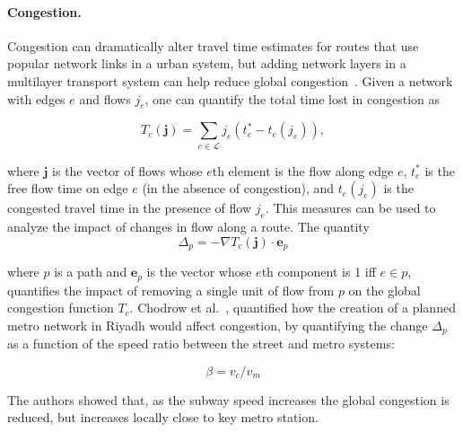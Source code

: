 \paragraph{Congestion.} 
Congestion can dramatically alter travel time estimates for routes that use popular network links in a urban system, but adding network layers in a multilayer transport system can help reduce global congestion~\cite{chodrow2016congestion}. Given a network with edges $e$ and flows $j_e$, one can quantify the total time lost in congestion as 

\begin{equation}
    T_c(\textbf{j})=\sum_{e\in \mathcal{L}}j_e(t_e^* - t_e(j_e)),
\end{equation}

where $\textbf{j}$ is the vector of flows whose $e$th element is the flow along edge $e$, $t_e^*$ is the free flow time on edge $e$ (in the absence of congestion), and $t_e(j_e)$ is the congested travel time in the presence of flow $j_e$. 
This measures can be used to analyze the impact of changes in flow along a route. The quantity
\begin{equation}
    \Delta_p = - \nabla T_c(\textbf{j}) \cdot \textbf{e}_p
\end{equation}

where $p$ is a path and $\textbf{e}_p$ is the vector whose $e$th component is 1 iff $e \in p$, quantifies the impact of removing a single unit of flow from $p$ on the global congestion function $T_c$. 
Chodrow et al.~\cite{chodrow2016congestion}, quantified how the creation of a planned metro network in Riyadh would affect congestion, by quantifying the change $\Delta_p$ as a function of the speed ratio between the street and metro systems:

\begin{equation}
    \beta = v_{c}/v_{m}
\end{equation}

The authors showed that, as the subway speed increases the global congestion is reduced, but increases locally close to key metro station.


